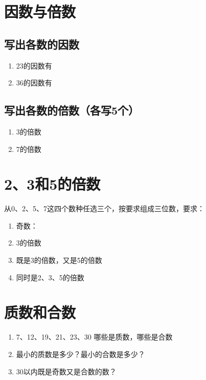 \documentclass[12pt]{article}
\begin{document}
\section*{因数与倍数}
\subsection{写出各数的因数}
\begin{enumerate}
    \item 23的因数有
    \item 36的因数有
\end{enumerate}
\subsection{写出各数的倍数（各写5个）}
\begin{enumerate}
    \item 3的倍数
    \item 7的倍数
\end{enumerate}
\section*{2、3和5的倍数}
从0、2、5、7这四个数种任选三个，按要求组成三位数，要求：
\begin{enumerate}
    \item 奇数：
    \item 3的倍数
    \item 既是3的倍数，又是5的倍数
    \item 同时是2、3、5的倍数
\end{enumerate}

\section*{质数和合数}
\begin{enumerate}
    \item 7、12、19、21、23、30 哪些是质数，哪些是合数
    \item 最小的质数是多少？最小的合数是多少？
    \item 30以内既是奇数又是合数的数？
\end{enumerate}
\end{document}

